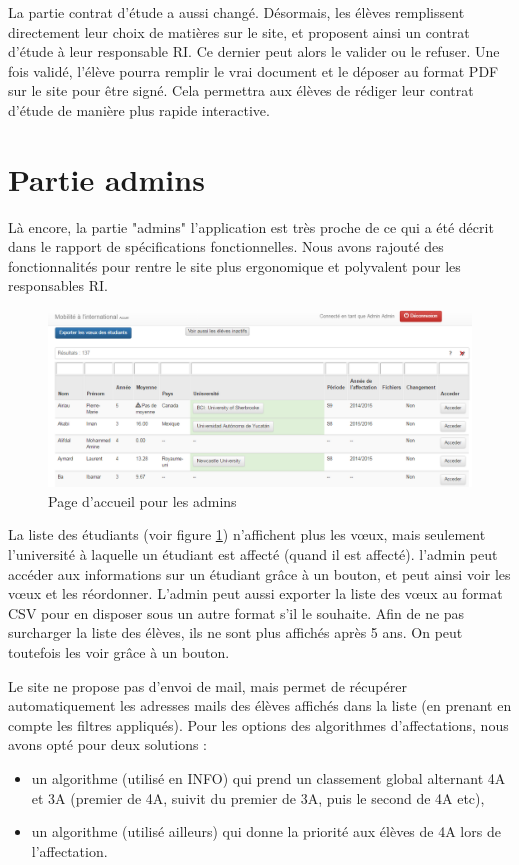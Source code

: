 La partie contrat d'étude a aussi changé. Désormais, les élèves remplissent directement leur choix de matières sur le site, et proposent ainsi un contrat d'étude à leur responsable RI. Ce dernier peut alors le valider ou le refuser.
Une fois validé, l'élève pourra remplir le vrai document et le déposer au format PDF sur le site pour être signé. Cela permettra aux élèves de rédiger leur contrat d'étude de manière plus rapide interactive.

\section{Partie admins}
Là encore, la partie "admins" l'application est très proche de ce qui a été décrit dans le rapport de spécifications fonctionnelles. Nous avons rajouté des fonctionnalités pour rentre le site plus ergonomique et polyvalent pour les responsables RI.

\begin{figure}
	\centering
	\includegraphics[scale=0.5]{images/accueil_admin.PNG}
	\caption{Page d'accueil pour les admins}
	\label{accueil_admins}
\end{figure}

La liste des étudiants (voir figure \ref{accueil_admins}) n'affichent plus les vœux, mais seulement l'université à laquelle un étudiant est affecté (quand il est affecté). l'admin peut accéder aux informations sur un étudiant grâce à un bouton, et peut ainsi voir les vœux et les réordonner. L'admin peut aussi exporter la liste des vœux au format CSV pour en disposer sous un autre format s'il le souhaite. Afin de ne pas surcharger la liste des élèves, ils ne sont plus affichés après 5 ans. On peut toutefois les voir grâce à un bouton.

Le site ne propose pas d'envoi de mail, mais permet de récupérer automatiquement les adresses mails des élèves affichés dans la liste (en prenant en compte les filtres appliqués).
\bigbreak
Pour les options des algorithmes d'affectations, nous avons opté pour deux solutions :
\begin{itemize}
	\item un algorithme (utilisé en INFO) qui prend un classement global alternant 4A et 3A (premier de 4A, suivit du premier de 3A, puis le second de 4A etc),
	\item un algorithme (utilisé ailleurs) qui donne la priorité aux élèves de 4A lors de l'affectation.
\end{itemize}

